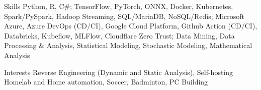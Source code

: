 \vspace{-4mm}
\vspace{-2mm}

\begin{cvskills}

	\cvskill
	{Skills}
	{Python, R, C\#; TensorFlow, PyTorch, ONNX, Docker, Kubernetes, Spark/PySpark, Hadoop Streaming, SQL/MariaDB, NoSQL/Redis;  Microsoft Azure, Azure DevOps (CD/CI), Google Cloud Platform, Github Action (CD/CI), Databricks, Kubeflow, MLFlow, Cloudflare Zero Trust; Data Mining, Data Processing \& Analysis, Statistical Modeling, Stochastic Modeling, Mathematical Analysis}




	\cvskill
	{Interests}
	{Reverse Engineering (Dynamic and Static Analysis), Self-hosting Homelab and Home automation, Soccer, Badminton, PC Building}

\end{cvskills}